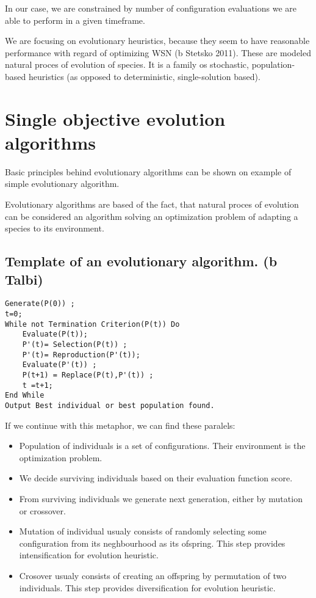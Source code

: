 \documentclass[12pt,oneside,draft]{fithesis2}
\begin{document}
In our case, we are constrained by number of configuration evaluations we are able to perform in a given timeframe. 

We are focusing on evolutionary heuristics, because they seem to have reasonable performance with regard of optimizing WSN (b Stetsko 2011). 
These are modeled natural proces of evolution of species. It is a family os stochastic, population-based heuristics (as opposed to deterministic, single-solution based). 

\section{Single objective evolution algorithms}

Basic principles behind evolutionary algorithms can be shown on example of simple evolutionary algorithm. 

Evolutionary algorithms are based of the fact, that natural proces of evolution can be considered an algorithm solving an optimization problem of adapting a species to its environment. 

\subsection{Template of an evolutionary algorithm. (b Talbi)}

\begin{verbatim}
Generate(P(0)) ; 
t=0; 
While not Termination Criterion(P(t)) Do 
	Evaluate(P(t)); 
	P'(t)= Selection(P(t)) ; 
	P'(t)= Reproduction(P'(t)); 
	Evaluate(P'(t)) ; 
	P(t+1) = Replace(P(t),P'(t)) ; 
	t =t+1; 
End While 
Output Best individual or best population found.
\end{verbatim}
If we continue with this metaphor, we can find these paralels:
\begin{itemize}
\item Population of individuals is a set of configurations. Their environment is the optimization problem.
\item We decide surviving individuals based on their evaluation function score.
\item From surviving individuals we generate next generation, either by mutation or crossover.
\item Mutation of individual usualy consists of randomly selecting some configuration from its neghbourhood as its ofspring. This step provides intensification for evolution heuristic.
\item Crosover usualy consists of creating an offspring by permutation of two individuals. This step provides diversification for evolution heuristic.
\end{itemize}
\end{document}
